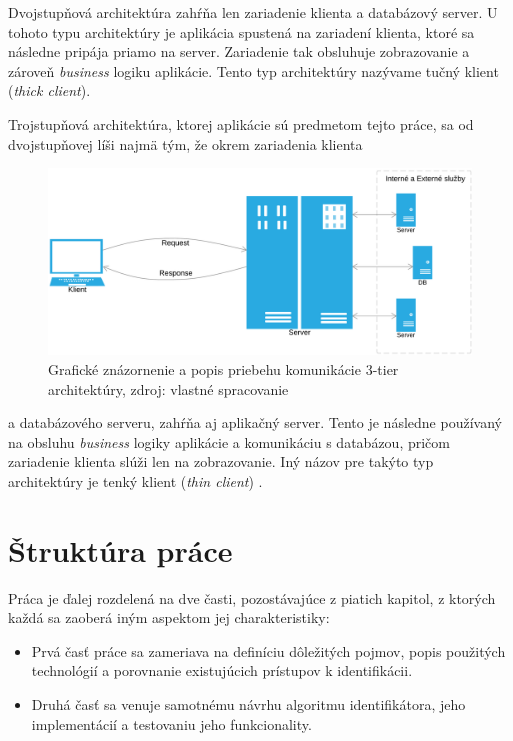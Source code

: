 \documentclass[
  digital, %
  oneside, %
  table,   %
  lof,     %
  nolot,   %
  nocover
]{fithesis3}
\begin{document}
Dvojstupňová architektúra zahŕňa len zariadenie klienta a databázový server.
U tohoto typu architektúry je aplikácia spustená na zariadení klienta, ktoré sa
následne pripája priamo na server. Zariadenie tak obsluhuje zobrazovanie a zároveň
\textit{business} logiku aplikácie. Tento typ architektúry
nazývame tučný klient (\textit{thick client}). 

Trojstupňová architektúra, ktorej aplikácie sú predmetom tejto práce, sa od
dvojstupňovej líši najmä tým, že okrem zariadenia klienta

\begin{figure}[H]
  \centering
    \includegraphics[width=\textwidth]{images/C-S-thin.png}
  \caption{Grafické znázornenie a popis priebehu komunikácie 3-tier architektúry,
  zdroj: vlastné spracovanie}
  \label{fig:cs-thin}
\end{figure}

\noindent a databázového serveru, zahŕňa aj aplikačný server. Tento je následne používaný na obsluhu
\textit{business} logiky aplikácie a komunikáciu s databázou, pričom zariadenie
klienta slúži len na zobrazovanie. Iný názov pre takýto typ architektúry je tenký
klient (\textit{thin client}) \cite{Oluwatosin:2014:CS}.

\section{Štruktúra práce}
Práca je ďalej rozdelená na dve časti, pozostávajúce z piatich kapitol, z ktorých každá sa zaoberá iným aspektom
jej charakteristiky:
\begin{itemize}
\item Prvá časť práce sa zameriava na
definíciu dôležitých pojmov, popis použitých technológií a porovnanie existujúcich prístupov k identifikácii.
\item Druhá časť sa venuje samotnému návrhu algoritmu identifikátora, jeho implementácií a testovaniu jeho funkcionality.
\end{itemize}
\end{document}
